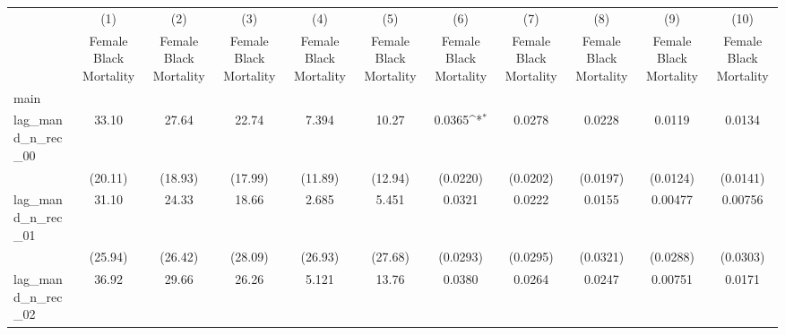 {
\def\sym#1{\ifmmode^{#1}\else\(^{#1}\)\fi}
\begin{longtable}{l*{10}{c}}
\hline\hline\endfirsthead\hline\endhead\hline\endfoot\endlastfoot
                    &\multicolumn{1}{c}{(1)}&\multicolumn{1}{c}{(2)}&\multicolumn{1}{c}{(3)}&\multicolumn{1}{c}{(4)}&\multicolumn{1}{c}{(5)}&\multicolumn{1}{c}{(6)}&\multicolumn{1}{c}{(7)}&\multicolumn{1}{c}{(8)}&\multicolumn{1}{c}{(9)}&\multicolumn{1}{c}{(10)}\\
                    &\multicolumn{1}{c}{Female Black Mortality}&\multicolumn{1}{c}{Female Black Mortality}&\multicolumn{1}{c}{Female Black Mortality}&\multicolumn{1}{c}{Female Black Mortality}&\multicolumn{1}{c}{Female Black Mortality}&\multicolumn{1}{c}{Female Black Mortality}&\multicolumn{1}{c}{Female Black Mortality}&\multicolumn{1}{c}{Female Black Mortality}&\multicolumn{1}{c}{Female Black Mortality}&\multicolumn{1}{c}{Female Black Mortality}\\
\hline
main                &                     &                     &                     &                     &                     &                     &                     &                     &                     &                     \\
lag\_mand\_n\_rec\_00   &       33.10         &       27.64         &       22.74         &       7.394         &       10.27         &      0.0365\sym{*}  &      0.0278         &      0.0228         &      0.0119         &      0.0134         \\
                    &     (20.11)         &     (18.93)         &     (17.99)         &     (11.89)         &     (12.94)         &    (0.0220)         &    (0.0202)         &    (0.0197)         &    (0.0124)         &    (0.0141)         \\
[1em]
lag\_mand\_n\_rec\_01   &       31.10         &       24.33         &       18.66         &       2.685         &       5.451         &      0.0321         &      0.0222         &      0.0155         &     0.00477         &     0.00756         \\
                    &     (25.94)         &     (26.42)         &     (28.09)         &     (26.93)         &     (27.68)         &    (0.0293)         &    (0.0295)         &    (0.0321)         &    (0.0288)         &    (0.0303)         \\
[1em]
lag\_mand\_n\_rec\_02   &       36.92         &       29.66         &       26.26         &       5.121         &       13.76         &      0.0380         &      0.0264         &      0.0247         &     0.00751         &      0.0171         \\

\end{longtable}}
